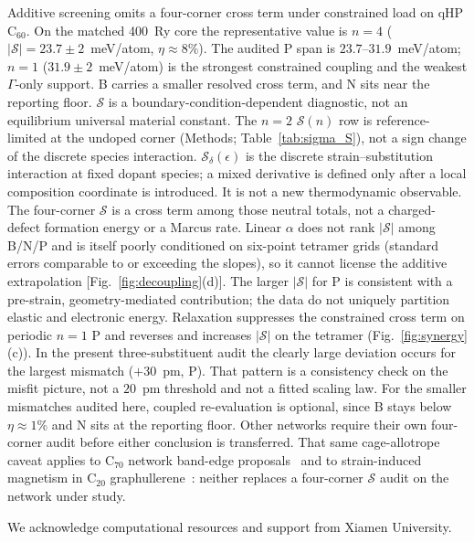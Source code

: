 \documentclass[%
 reprint,
 groupedaddress,
 amsmath,amssymb,
 aps,
 prb,
 floatfix,
]{revtex4-2}
\begin{document}
Additive screening omits a four-corner cross term under constrained load on qHP C$_{60}$.
On the matched 400~Ry core the representative value is $n{=}4$ ($|\mathcal{S}|=23.7\pm 2$~meV/atom, $\eta\approx 8\%$). The audited P span is $23.7$--$31.9$~meV/atom; $n{=}1$ ($31.9\pm 2$~meV/atom) is the strongest constrained coupling and the weakest $\Gamma$-only support. B carries a smaller resolved cross term, and N sits near the reporting floor.
$\mathcal{S}$ is a boundary-condition-dependent diagnostic, not an equilibrium universal material constant.
The $n{=}2$ $\mathcal{S}(n)$ row is reference-limited at the undoped corner (Methods; Table~\ref{tab:sigma_S}), not a sign change of the discrete species interaction.
$\mathcal{S}_\delta(\epsilon)$ is the discrete strain--substitution interaction at fixed dopant species; a mixed derivative is defined only after a local composition coordinate is introduced. It is not a new thermodynamic observable.
The four-corner $\mathcal{S}$ is a cross term among those neutral totals, not a charged-defect formation energy or a Marcus rate.
Linear $\alpha$ does not rank $|\mathcal{S}|$ among B/N/P and is itself poorly conditioned on six-point tetramer grids (standard errors comparable to or exceeding the slopes), so it cannot license the additive extrapolation [Fig.~\ref{fig:decoupling}(d)].
The larger $|\mathcal{S}|$ for P is consistent with a pre-strain, geometry-mediated contribution; the data do not uniquely partition elastic and electronic energy.
Relaxation suppresses the constrained cross term on periodic $n{=}1$ P and reverses and increases $|\mathcal{S}|$ on the tetramer (Fig.~\ref{fig:synergy}(c)).
In the present three-substituent audit the clearly large deviation occurs for the largest mismatch ($+30$~pm, P). That pattern is a consistency check on the misfit picture, not a $20$~pm threshold and not a fitted scaling law.
For the smaller mismatches audited here, coupled re-evaluation is optional, since B stays below $\eta\approx 1$\% and N sits at the reporting floor.
Other networks require their own four-corner audit before either conclusion is transferred.
That same cage-allotrope caveat applies to C$_{70}$ network band-edge proposals~\cite{Xu2025C70network} and to strain-induced magnetism in C$_{20}$ graphullerene~\cite{Nie2026strainC20}: neither replaces a four-corner $\mathcal{S}$ audit on the network under study.

\begin{acknowledgments}
We acknowledge computational resources and support from Xiamen University.
\end{acknowledgments}
\end{document}
